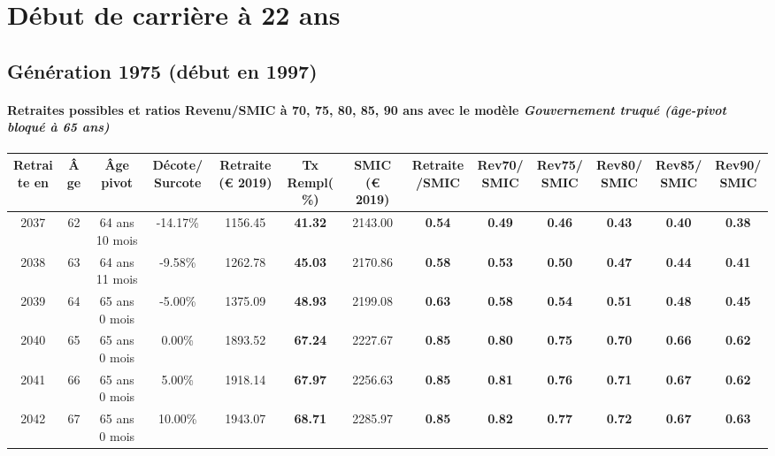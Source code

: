  \addto{\captionsenglish}{ \renewcommand{\mtctitle}{}} \setcounter{minitocdepth}{2} 
 \minitoc \newpage 

\section{Début de carrière à 22 ans} 

\subsection{Génération 1975 (début en 1997)} 

\paragraph{Retraites possibles et ratios Revenu/SMIC à 70, 75, 80, 85, 90 ans avec le modèle \emph{Gouvernement truqué (âge-pivot bloqué à 65 ans)}}  
 
{ \scriptsize \begin{center} 
\begin{tabular}[htb]{|c|c||c|c||c|c||c||c|c|c|c|c|c|} 
\hline 
 Retraite en &  Âge &  Âge pivot &  Décote/Surcote &  Retraite (\euro{} 2019) &  Tx Rempl(\%) &  SMIC (\euro{} 2019) &  Retraite/SMIC &  Rev70/SMIC &  Rev75/SMIC &  Rev80/SMIC &  Rev85/SMIC &  Rev90/SMIC \\ 
\hline \hline 
 2037 &  62 &  64 ans 10 mois &  -14.17\% &  1156.45 &  {\bf 41.32} &  2143.00 &  {\bf {\color{red} 0.54}} &  {\bf {\color{red} 0.49}} &  {\bf {\color{red} 0.46}} &  {\bf {\color{red} 0.43}} &  {\bf {\color{red} 0.40}} &  {\bf {\color{red} 0.38}} \\ 
\hline 
 2038 &  63 &  64 ans 11 mois &  -9.58\% &  1262.78 &  {\bf 45.03} &  2170.86 &  {\bf {\color{red} 0.58}} &  {\bf {\color{red} 0.53}} &  {\bf {\color{red} 0.50}} &  {\bf {\color{red} 0.47}} &  {\bf {\color{red} 0.44}} &  {\bf {\color{red} 0.41}} \\ 
\hline 
 2039 &  64 &  65 ans 0 mois &  -5.00\% &  1375.09 &  {\bf 48.93} &  2199.08 &  {\bf {\color{red} 0.63}} &  {\bf {\color{red} 0.58}} &  {\bf {\color{red} 0.54}} &  {\bf {\color{red} 0.51}} &  {\bf {\color{red} 0.48}} &  {\bf {\color{red} 0.45}} \\ 
\hline 
 2040 &  65 &  65 ans 0 mois &  0.00\% &  1893.52 &  {\bf 67.24} &  2227.67 &  {\bf {\color{red} 0.85}} &  {\bf {\color{red} 0.80}} &  {\bf {\color{red} 0.75}} &  {\bf {\color{red} 0.70}} &  {\bf {\color{red} 0.66}} &  {\bf {\color{red} 0.62}} \\ 
\hline 
 2041 &  66 &  65 ans 0 mois &  5.00\% &  1918.14 &  {\bf 67.97} &  2256.63 &  {\bf {\color{red} 0.85}} &  {\bf {\color{red} 0.81}} &  {\bf {\color{red} 0.76}} &  {\bf {\color{red} 0.71}} &  {\bf {\color{red} 0.67}} &  {\bf {\color{red} 0.62}} \\ 
\hline 
 2042 &  67 &  65 ans 0 mois &  10.00\% &  1943.07 &  {\bf 68.71} &  2285.97 &  {\bf {\color{red} 0.85}} &  {\bf {\color{red} 0.82}} &  {\bf {\color{red} 0.77}} &  {\bf {\color{red} 0.72}} &  {\bf {\color{red} 0.67}} &  {\bf {\color{red} 0.63}} \\ 
\hline 
\hline 
\end{tabular} 
\end{center} } 
